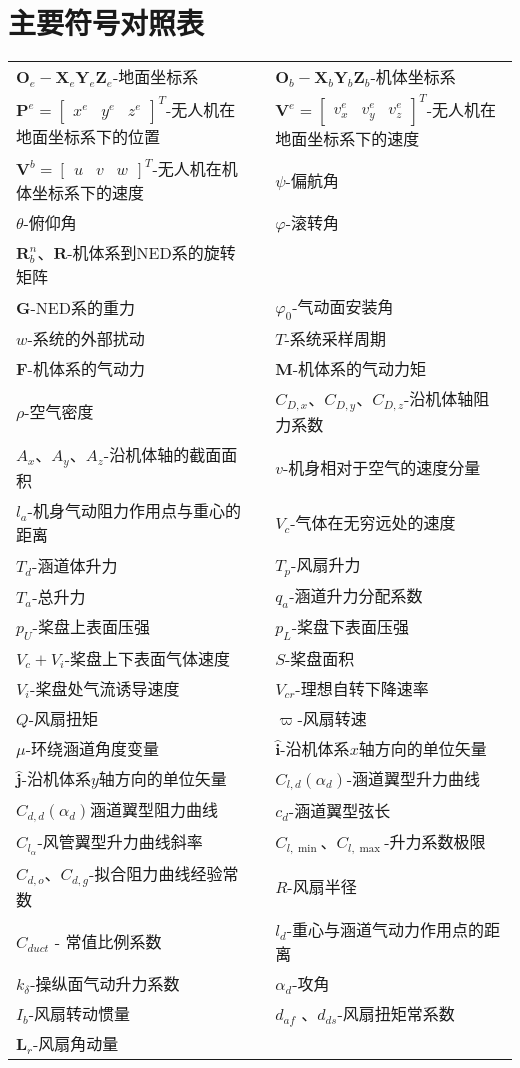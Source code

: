\chapter{主要符号对照表}

\begin{table}
	\centering{}%
	\begin{tabular}{l>{\centering}p{0.5cm}l}
	 $ \boldsymbol{O}_e-\boldsymbol{X}_e\boldsymbol{Y}_e\boldsymbol{Z}_e $-地面坐标系  &  & ${\boldsymbol{O}_b}-{\boldsymbol{X}_b}{\boldsymbol{Y}_b}{\boldsymbol{Z}_b}$-机体坐标系\tabularnewline
     $\boldsymbol{P}^{e}=\begin{bmatrix}{x}^{e}&{y}^{e}&{z}^{e}\end{bmatrix}^{T}$-无人机在地面坐标系下的位置 &  & $\boldsymbol{V}^{e}=\begin{bmatrix}{v}^{e}_{x}&{v}^{e}_{y}&{v}^{e}_{z}\end{bmatrix}^{T}$-无人机在地面坐标系下的速度\tabularnewline
     $\boldsymbol{V}^{b}=\begin{bmatrix}{u}&{v}&{w}\end{bmatrix}^{T}$-无人机在机体坐标系下的速度 && $ \psi $-偏航角\tabularnewline
	 $\theta$-俯仰角 && $\varphi$-滚转角\tabularnewline
	 $\boldsymbol{R}^n_b$、$\boldsymbol{R}$-机体系到NED系的旋转矩阵\tabularnewline
	 $\boldsymbol{G}$-NED系的重力  							  &  &   $\varphi_0 $-气动面安装角\tabularnewline
	 $ w $-系统的外部扰动								&  &  $T$-系统采样周期\tabularnewline
	 $\boldsymbol{F}$-机体系的气动力 						    &  &   $\boldsymbol{M}$-机体系的气动力矩\tabularnewline
	 $\rho$-空气密度 								  &  &  $C_{D,x} $、$ C_{D,y} $、$ C_{D,z} $-沿机体轴阻力系数\tabularnewline
	 $A_x $、$ A_y $、$ A_z $-沿机体轴的截面面积 		 &  &  $v$-机身相对于空气的速度分量\tabularnewline 
	 $l_{a}$-机身气动阻力作用点与重心的距离   			  &  &  $V_c$-气体在无穷远处的速度\tabularnewline
	 $T_d$-涵道体升力  								 &  &  $T_p$-风扇升力\tabularnewline
	 $T_a$-总升力 								      &  &  $q_a$-涵道升力分配系数\tabularnewline
	 $ p_U $-桨盘上表面压强 						   &  &  $p_L$-桨盘下表面压强\tabularnewline
	 $V_c+V_i$-桨盘上下表面气体速度 					 &  &  $S$-桨盘面积\tabularnewline
	 $ V_i $-桨盘处气流诱导速度 						  &  &  $ V_{cr} $-理想自转下降速率\tabularnewline
	 $ Q $-风扇扭矩 								 &  &  $ \varpi $-风扇转速\tabularnewline
	 $\mu$-环绕涵道角度变量 						  &  &  $\hat{\boldsymbol{i}}$-沿机体系$x$轴方向的单位矢量\tabularnewline 
	 $\hat{\boldsymbol{j}}$-沿机体系$y$轴方向的单位矢量  	   &  &  $C_{l, d}(\alpha_d)$-涵道翼型升力曲线\tabularnewline 
	 $C_{d, d}(\alpha_d)$涵道翼型阻力曲线  		      &  &  $c_d$-涵道翼型弦长\tabularnewline 
	 $C_{l_{\alpha}}$-风管翼型升力曲线斜率  			 &  &  $C_{l, \min }$、$ C_{l, \max } $-升力系数极限\tabularnewline 
	 $C_{d, o }$、$C_{d, g }$-拟合阻力曲线经验常数 	&  &  $R$-风扇半径\tabularnewline 
	 $C_{d u c t}$ - 常值比例系数  					&  &  $l_{d}$-重心与涵道气动力作用点的距离\tabularnewline
	 $k_{\delta}$-操纵面气动升力系数 				 &  &  $\alpha_d$-攻角\tabularnewline
	 $ I_{b}$-风扇转动惯量  						   &  &  $ d_{af} $ 、$ d_{ds} $-风扇扭矩常系数\tabularnewline
	 $\boldsymbol{L}_{{r}}$-风扇角动量  						&  & \tabularnewline 					
	\end{tabular}
\end{table}